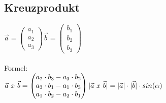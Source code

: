 \subsection{Kreuzprodukt}
$
\vec{a} = 
\begin{pmatrix}
    a_1 \\ a_2 \\ a_3
\end{pmatrix}
\vec{b} =
\begin{pmatrix}
    b_1 \\ b_2 \\ b_3
\end{pmatrix}
$
\\\\
Formel: \\
$
\vec{a}\ x\ \vec{b} = 
\begin{pmatrix}
    a_2 \cdot b_3 - a_3 \cdot b_2 \\
    a_3 \cdot b_1 - a_1 \cdot b_3 \\
    a_1 \cdot b_2 - a_2 \cdot b_1 \\
\end{pmatrix}
\\\\
|\vec{a} \ x \ \vec{b}| = |\vec{a}| \cdot |\vec{b}| \cdot sin(\alpha)
$



